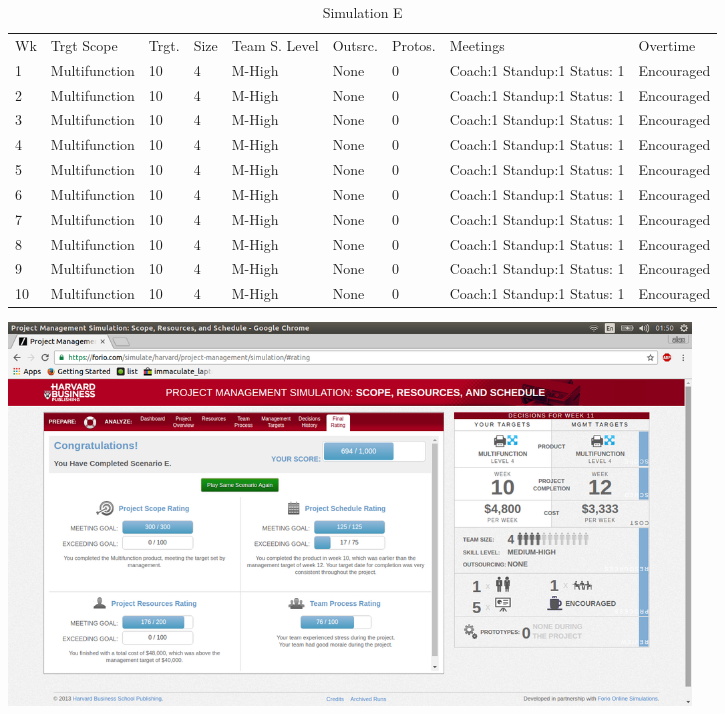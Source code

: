 \documentclass{article}
\begin{document}
 
\begin{table}[H]
\centering
\caption{Simulation E}
\label{my-label}
\begin{tabular}{lllllllll}
Wk& Trgt Scope& Trgt.& Size& Team S. Level& Outsrc.& Protos.& Meetings                         & Overtime   \\
1  & Multifunction & 10                & 4         & M-High      & None        & 0       & Coach:1 Standup:1 Status: 1 & Encouraged \\
2  & Multifunction & 10                & 4         & M-High      & None        & 0       & Coach:1 Standup:1 Status: 1 & Encouraged \\
3  & Multifunction & 10                & 4         & M-High      & None        & 0       & Coach:1 Standup:1 Status: 1 & Encouraged \\
4  & Multifunction & 10                & 4         & M-High      & None        & 0       & Coach:1 Standup:1 Status: 1 & Encouraged \\
5  & Multifunction & 10                & 4         & M-High      & None        & 0       & Coach:1 Standup:1 Status: 1 & Encouraged \\
6  & Multifunction & 10                & 4         & M-High      & None        & 0       & Coach:1 Standup:1 Status: 1 & Encouraged \\
7  & Multifunction & 10                & 4         & M-High      & None        & 0       & Coach:1 Standup:1 Status: 1 & Encouraged \\
8  & Multifunction & 10                & 4         & M-High      & None        & 0       & Coach:1 Standup:1 Status: 1 & Encouraged \\
9  & Multifunction & 10                & 4         & M-High      & None        & 0       & Coach:1 Standup:1 Status: 1 & Encouraged \\
10 & Multifunction & 10                & 4         & M-High      & None        & 0       & Coach:1 Standup:1 Status: 1 & Encouraged
\end{tabular}
\end{table}
\includegraphics[height=4in]{sim_e.png}








	
\end{document}
